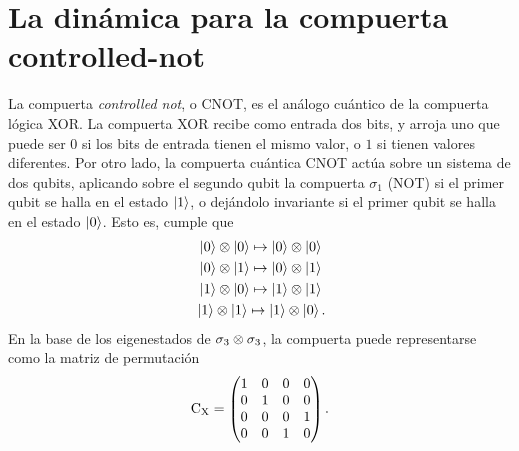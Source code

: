 \section{La dinámica para la compuerta controlled-not}
La compuerta \textit{controlled not}, o CNOT, es el análogo cuántico de la compuerta lógica XOR. La compuerta XOR recibe como entrada dos bits, y arroja uno que puede ser $0$ si los bits de entrada tienen el mismo valor, o $1$ si tienen valores diferentes. Por otro lado, la compuerta cuántica CNOT actúa sobre un sistema de dos qubits, aplicando sobre el segundo qubit la compuerta $\sigma_{1}$ (NOT) si el primer qubit se halla en el estado $\ket{1}$, o dejándolo invariante si el primer qubit se halla en el estado $\ket{0}$. Esto es, cumple que \cite{Chuang}
\begin{align*}
    \ket{0}\otimes\ket{0}\mapsto\ket{0}\otimes\ket{0}\\
    \ket{0}\otimes\ket{1}\mapsto\ket{0}\otimes\ket{1}\\
    \ket{1}\otimes\ket{0}\mapsto\ket{1}\otimes\ket{1}\\
    \ket{1}\otimes\ket{1}\mapsto\ket{1}\otimes\ket{0} \rlap{.}
\end{align*}
En la base de los eigenestados de $\sigma_{3}\otimes\sigma_{3}$, la compuerta puede representarse como la matriz de permutación
\begin{equation*}
    \text{C}_{\text{X}}=\begin{pmatrix}
        1&0&0&0\\
        0&1&0&0\\
        0&0&0&1\\
        0&0&1&0
    \end{pmatrix}.
\end{equation*}

